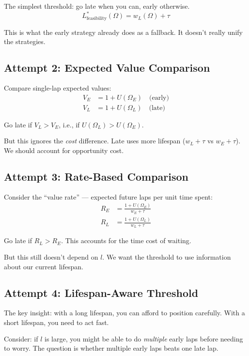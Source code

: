 \documentclass{article}
\begin{document}
The simplest threshold: go late when you can, early otherwise.
\[
L^*_{\text{feasibility}}(\Omega) = w_L(\Omega) + \tau
\]

This is what the early strategy already does as a fallback. It doesn't really unify the strategies.

\subsection{Attempt 2: Expected Value Comparison}

Compare single-lap expected values:
\begin{align}
    V_E &= 1 + U(\Omega_E) \quad \text{(early)} \\
    V_L &= 1 + U(\Omega_L) \quad \text{(late)}
\end{align}

Go late if $V_L > V_E$, i.e., if $U(\Omega_L) > U(\Omega_E)$.

But this ignores the \emph{cost} difference. Late uses more lifespan ($w_L + \tau$ vs $w_E + \tau$). We should account for opportunity cost.

\subsection{Attempt 3: Rate-Based Comparison}

Consider the ``value rate'' — expected future laps per unit time spent:
\begin{align}
    R_E &= \frac{1 + U(\Omega_E)}{w_E + \tau} \\
    R_L &= \frac{1 + U(\Omega_L)}{w_L + \tau}
\end{align}

Go late if $R_L > R_E$. This accounts for the time cost of waiting.

But this still doesn't depend on $l$. We want the threshold to use information about our current lifespan.

\subsection{Attempt 4: Lifespan-Aware Threshold}

The key insight: with a long lifespan, you can afford to position carefully. With a short lifespan, you need to act fast.

Consider: if $l$ is large, you might be able to do \emph{multiple} early laps before needing to worry. The question is whether multiple early laps beats one late lap.
\end{document}

